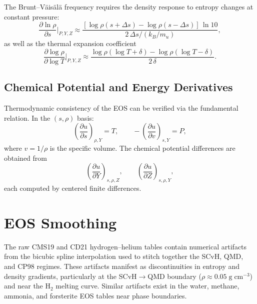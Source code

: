 \documentclass[twocolumn]{aastex701}
\begin{document}
The Brunt--V\"ais\"al\"a frequency requires the density response to entropy changes at constant pressure:
\begin{equation}
    \frac{\partial \ln \rho}{\partial s}\bigg|_{P,Y,Z} \approx \frac{[\log\rho(s+\Delta s) - \log\rho(s-\Delta s)]\,\ln 10}{2\,\Delta s / (k_B/m_u)},
\end{equation}
as well as the thermal expansion coefficient
\begin{equation}
    \frac{\partial \log \rho}{\partial \log T}\bigg|_{P,Y,Z} \approx \frac{\log\rho(\log T + \delta) - \log\rho(\log T - \delta)}{2\,\delta}.
\end{equation}

\subsection{Chemical Potential and Energy Derivatives}

Thermodynamic consistency of the EOS can be verified via the fundamental relation.
In the $(s,\rho)$ basis:
\begin{equation}
    \left(\frac{\partial u}{\partial s}\right)_{\!\rho,Y} = T, \qquad
    -\left(\frac{\partial u}{\partial v}\right)_{\!s,Y} = P,
\end{equation}
where $v = 1/\rho$ is the specific volume.
The chemical potential differences are obtained from
\begin{equation}
    \left(\frac{\partial u}{\partial Y}\right)_{\!s,\rho,Z}, \qquad
    \left(\frac{\partial u}{\partial Z}\right)_{\!s,\rho,Y},
\end{equation}
each computed by centered finite differences.

\section{EOS Smoothing}\label{sec:smoothing}

The raw CMS19 and CD21 hydrogen--helium tables contain numerical artifacts from the bicubic spline interpolation used to stitch together the SCvH, QMD, and CP98 regimes.
These artifacts manifest as discontinuities in entropy and density gradients, particularly at the SCvH$\to$QMD boundary ($\rho \approx 0.05\;\mathrm{g\;cm^{-3}}$) and near the H$_2$ melting curve.
Similar artifacts exist in the water, methane, ammonia, and forsterite EOS tables near phase boundaries.
\end{document}
